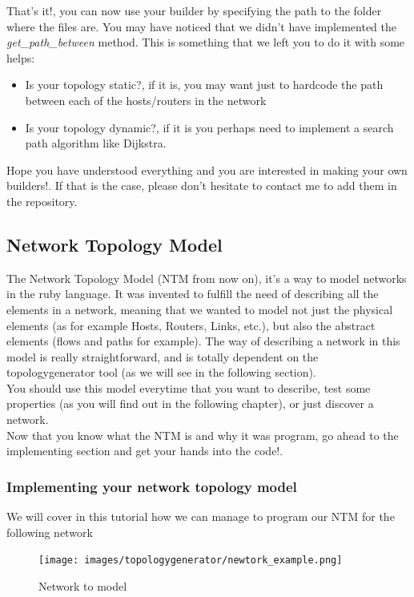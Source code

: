 That's it!, you can now use your builder by specifying the path to the folder where the files are. You may have noticed that we didn't have implemented the \textit{get\_path\_between} method. This is something that we left you to do it with some helps:
\begin{itemize}
\item Is your topology static?, if it is, you may want just to hardcode the path between each of the hosts/routers in the network
\item Is your topology dynamic?, if it is you perhaps need to implement a search path algorithm like Dijkstra.
\end{itemize}

Hope you have understood everything and you are interested in making your own builders!. If that is the case, please don't hesitate to contact me to add them in the repository.

\subsection{Network Topology Model}

The Network Topology Model (NTM from now on), it's a way to model networks in the ruby language. It was invented to fulfill the need of describing all the elements in a network, meaning that we wanted to model not just the physical elements (as for example Hosts, Routers, Links, etc.), but also the abstract elements (flows and paths for example). The way of describing a network in this model is really straightforward, and is totally dependent on the topologygenerator tool (as we will see in the following section). \\
You should use this model everytime that you want to describe, test some properties (as you will find out in the following chapter), or just discover a network. \\
Now that you know what the NTM is and why it was program, go ahead to the implementing section and get your hands into the code!.

\subsubsection{Implementing your network topology model}

We will cover in this tutorial how we can manage to program our NTM for the following network 

\begin{figure}[H]
\centering
\texttt{[image: images/topologygenerator/newtork\_example.png]}
\caption{Network to model}
\end{figure}

